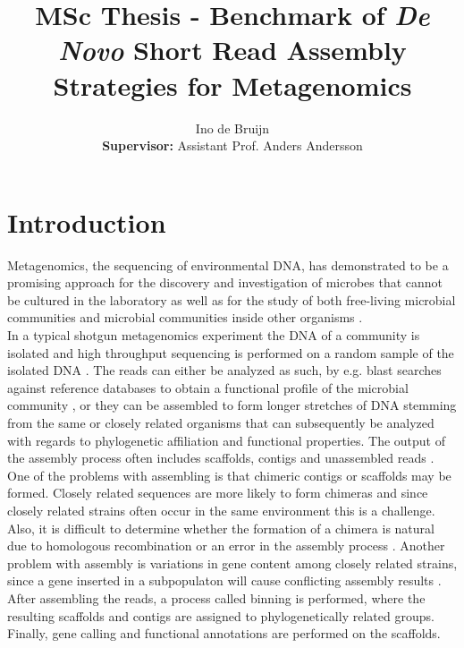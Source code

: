 \documentclass[a4paper,12pt]{article}
\begin{document}
\title{MSc Thesis - Benchmark of {\em De Novo} Short Read Assembly Strategies
for Metagenomics}
\author{Ino de Bruijn\\ {\bf Supervisor:} Assistant Prof. Anders Andersson}

\maketitle

\section{Introduction}
Metagenomics, the sequencing of environmental DNA, has demonstrated to be a
promising approach for the discovery and investigation of microbes that cannot
be cultured in the laboratory \cite{Eisen17355177} as well as for the study of
both free-living microbial communities \cite{Andersson18497291} and microbial
communities inside other organisms \cite{Qin20203603,Hess21273488}.\\


In a typical shotgun metagenomics experiment the DNA of a community is isolated
and high throughput sequencing is performed on a random sample of the isolated
DNA \cite{Morgan20419134}. The reads can either be analyzed as such, by e.g.
blast searches against reference databases to obtain a functional profile of
the microbial community \cite{Tringe15845853}, or they can be assembled to form
longer stretches of DNA stemming from the same or closely related organisms
that can subsequently be analyzed with regards to phylogenetic affiliation and
functional properties. The output of the assembly process often includes
scaffolds, contigs and unassembled reads \cite{Mavromatis17468765}. One of the
problems with assembling is that chimeric contigs or scaffolds may be formed.
Closely related sequences are more likely to form chimeras and since closely
related strains often occur in the same environment this is a challenge. Also,
it is difficult to determine whether the formation of a chimera is natural due
to homologous recombination or an error in the assembly process
\cite{Tyson14961025}. Another problem with assembly is variations in gene
content among closely related strains, since a gene inserted in a subpopulaton
will cause conflicting assembly results \cite{Hallam17114289}. After assembling
the reads, a process called binning is performed, where the resulting scaffolds
and contigs are assigned to phylogenetically related groups. Finally, gene
calling and functional annotations are performed on the scaffolds.\\
\end{document}
